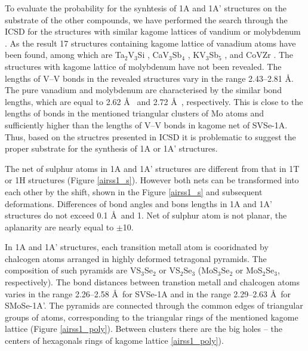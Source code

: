 \documentclass[a4paperm]{article}
\begin{document}
To evaluate the probability for the synhtesis of 1A and 1A' structures on the substrate of the other compounds, we have performed the search through the ICSD for the structures with similar kagome lattices of vandium or molybdenum .
As the result 17 structures containing kagome lattice of vanadium atoms have been found, among which are Ta$_2$V$_3$Si \cite{Ta2V3Si}, CaV$_3$Sb$_4$ \cite{ CaV3Sb4}, KV$_3$Sb$_5$ \cite{KV3Sb5}, and CoVZr \cite{ZrVCO}.
The structures with kagome lattice of molybdenum have not been revealed.
The lengths of V--V bonds in the revealed structures vary in the range 2.43--2.81 \AA.
The pure vanadium and molybdenum are characterised by the similar bond lengths, which are equal to 2.62 \AA\ \cite{MoV} and 2.72 \AA\ \cite{MoV}, respectively.
This is close to the lengths of bonds in the mentioned triangular clusters of Mo atoms and sufficiently higher than the lengths of V--V bonds in kagome net of SVSe-1A.
Thus, based on the structres presented in ICSD it is problematic to suggest the proper substrate for the synthesis of 1A or 1A' structures.


The net of sulphur atoms in 1A and 1A' structures are different from that in 1T or 1H structures (Figure \ref{airss1_s}).
However both nets can be transformed into each other by the shift, shown in the Figure \ref{airss1_s} and subsequent deformations.
Differences of bond angles and bons lengths in 1A and 1A' structures do not exceed 0.1 \AA\ and 1\textdegree.
Net of sulphur atom is not planar, the aplanarity are nearly equal to $\pm$10\textdegree.

In 1A and 1A' structures, each transition metall atom is cooridnated by  chalcogen atoms arranged in highly deformed tetragonal pyramids.
The composition of such pyramids are VS$_3$Se$_2$ or VS$_2$Se$_3$ (MoS$_3$Se$_2$ or MoS$_2$Se$_3$, respectively).
The bond distances between transtion metall and chalcogen atoms varies in the range 2.26--2.58 \AA\ for SVSe-1A and in the range 2.29--2.63 \AA\ for SMoSe-1A'.
The pyramids are connected through the common edges of triangular groups of atoms, corresponding to the triangular rings of the mentioned kagome lattice (Figure \ref{airss1_poly}).
Between clusters there are the big holes -- the centers of hexagonals rings of kagome lattice \ref{airss1_poly}).
\end{document}
